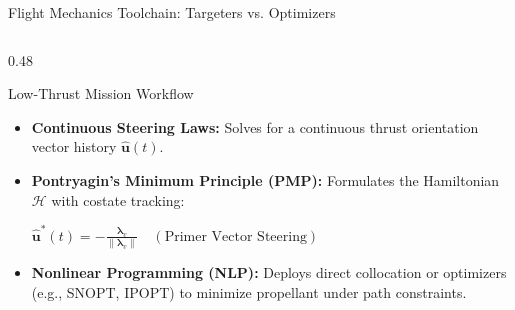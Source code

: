 \documentclass[aspectratio=169, 10pt]{beamer}
\begin{document}
\begin{frame}{Flight Mechanics Toolchain: Targeters vs. Optimizers}
\begin{columns}[T]
        \begin{column}{0.48\textwidth}
            \begin{exampleblock}{Low-Thrust Mission Workflow}
                \scriptsize
                \begin{itemize}\setlength{\itemsep}{1.5pt}\setlength{\topsep}{0pt}
                    \item \textbf{Continuous Steering Laws:} Solves for a continuous thrust orientation vector history $\hat{\mathbf{u}}(t)$.
                    \item \textbf{Pontryagin's Minimum Principle (PMP):} Formulates the Hamiltonian $\mathcal{H}$ with costate tracking:
                    \par\vspace{1pt}
                    {\centering $\hat{\mathbf{u}}^*(t) = -\frac{\boldsymbol{\lambda}_v}{\|\boldsymbol{\lambda}_v\|} \quad (\text{Primer Vector Steering})$ \par}
                    \item \textbf{Nonlinear Programming (NLP):} Deploys direct collocation or optimizers (e.g., SNOPT, IPOPT) to minimize propellant under path constraints.
                \end{itemize}
            \end{exampleblock}
        \end{column}
    \end{columns}
\end{frame}
\end{document}
